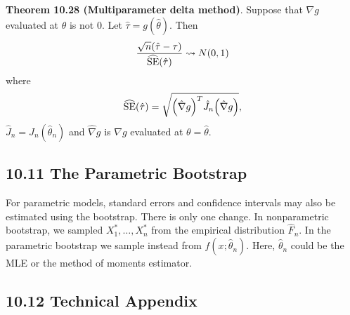 \textbf{Theorem 10.28 (Multiparameter delta method)}. Suppose that
\(\nabla g\) evaluated at \(\hat{\theta}\) is not 0. Let
\(\hat{\tau} = g(\hat{\theta})\). Then
\[
\frac{\sqrt{n}(\hat{\tau} - \tau)}{\widehat{\operatorname{\mathrm{SE}}}(\hat{\tau})} \leadsto N(0, 1)
\]
where
\[
\widehat{\SE}(\hat{\tau}) = \sqrt{\left(\hat{\nabla} g \right)^T \hat{J}_{n} \left(\hat{\nabla} g \right)} ,
\]
\(\hat{J}_{n} = J_{n}(\hat{\theta}_{n})\) and \(\hat{\nabla}g\) is
\(\nabla g\) evaluated at \(\theta = \hat{\theta}\).

\subsection*{10.11 The Parametric
Bootstrap}\label{the-parametric-bootstrap}
For parametric models, standard errors and confidence intervals may also
be estimated using the bootstrap. There is only one change. In
nonparametric bootstrap, we sampled \(X_{1}^{*}, \dots, X_{n}^{*}\) from the
empirical distribution \(\hat{F}_{n}\). In the parametric bootstrap we
sample instead from \(f(x; \hat{\theta}_{n})\). Here, \(\hat{\theta}_{n}\)
could be the MLE or the method of moments estimator.

\subsection*{10.12 Technical Appendix}
